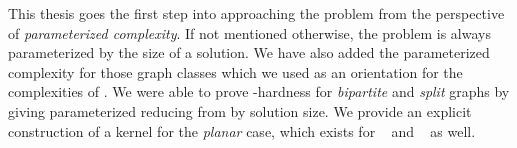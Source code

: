 This thesis goes the first step into approaching the problem from the perspective of \textit{parameterized complexity}.
If not mentioned otherwise, the problem is always parameterized by the size of a solution.
We have also added the parameterized complexity for those graph classes which we used as an orientation for the complexities of \sdom.
We were able to prove \WTWO-hardness for \textit{bipartite} and \textit{split} graphs by giving parameterized reducing from \doms by solution size. We provide an explicit construction of a kernel for the \textit{planar} case, which exists for \doms~\cite{Alber2004} and \tdoms~\cite{Garnero2019} as well.



